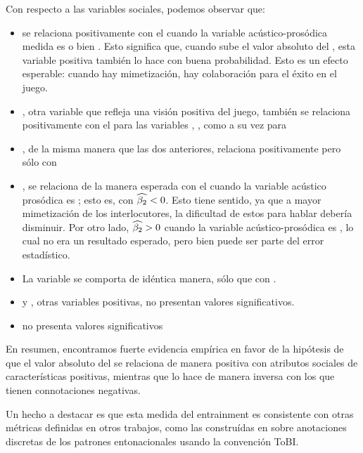 Con respecto a las variables sociales, podemos observar que:

\begin{itemize}
  \item \svcontributes se relaciona positivamente con el \absentrainment cuando la variable acústico-prosódica medida es \FOMEAN o bien \NOISETOHARMONICS. Esto significa que, cuando sube el valor absoluto del \entrainment, esta variable positiva también lo hace con buena probabilidad. Esto es un efecto esperable: cuando hay mimetización, hay colaboración para el éxito en el juego.
  \item \svclear, otra variable que refleja una visión positiva del juego, también se relaciona positivamente con el \absentrainment para las variables \FOMEAN, \NOISETOHARMONICS, \ENGMAX como a su vez para \PHONAVG
  \item \svengaged, de la misma manera que las dos anteriores, relaciona positivamente pero sólo con \FOMEAN
  \item \svdifficult, se relaciona de la manera esperada con el \absentrainment cuando la variable acústico prosódica es \ENGMAX; esto es, con $\widehat{\beta_2} < 0$. Esto tiene sentido, ya que a mayor mimetización de los interlocutores, la dificultad de estos para hablar debería disminuir. Por otro lado, $\widehat{\beta_2} > 0$ cuando la variable acústico-prosódica es \ENGMEAN, lo cual no era un resultado esperado, pero bien puede ser parte del error estadístico.
  \item La variable \svbored se comporta de idéntica manera, sólo que con \FOMEAN.
  \item \svplanning y \svencourages, otras variables positivas, no presentan valores significativos.
  \item \svdislikes no presenta valores significativos
\end{itemize}


En resumen, encontramos fuerte evidencia empírica en favor de la hipótesis de que el valor absoluto del \entrainment se relaciona de manera positiva con atributos sociales de características positivas, mientras que lo hace de manera inversa con los que tienen connotaciones negativas.

Un hecho a destacar es que esta medida del entrainment es consistente con otras métricas definidas en otros trabajos, como las construídas en \cite{gravano2015backward} sobre anotaciones discretas de los patrones entonacionales usando la convención ToBI\cite{pitrelli1994evaluation}.


